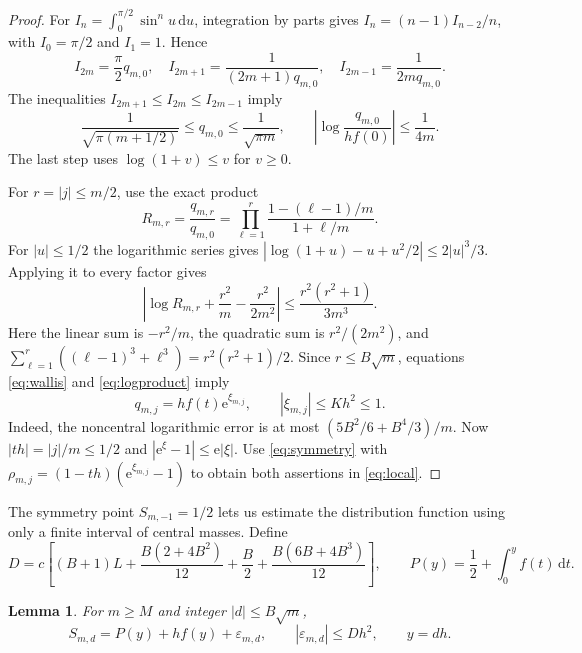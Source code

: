 \documentclass[11pt]{amsart}
\newtheorem{lemma}[theorem]{Lemma}
\newcommand{\ee}{\mathrm e}
\newcommand{\dd}{\,\mathrm d}
\begin{document}
\begin{proof}
For $I_n=\int_0^{\pi/2}\sin^n u\dd u$, integration by parts gives
$I_n=(n-1)I_{n-2}/n$, with $I_0=\pi/2$ and $I_1=1$. Hence
\[
 I_{2m}=\frac\pi2q_{m,0},\quad
 I_{2m+1}=\frac1{(2m+1)q_{m,0}},\quad
 I_{2m-1}=\frac1{2m q_{m,0}}.
\]
The inequalities $I_{2m+1}\le I_{2m}\le I_{2m-1}$ imply
\begin{equation}\label{eq:wallis}
 \frac1{\sqrt{\pi(m+1/2)}}\le q_{m,0}\le\frac1{\sqrt{\pi m}},
 \qquad
 \left|\log\frac{q_{m,0}}{hf(0)}\right|\le\frac1{4m}.
\end{equation}
The last step uses $\log(1+v)\le v$ for $v\ge0$.

For $r=|j|\le m/2$, use the exact product
\[
 R_{m,r}=\frac{q_{m,r}}{q_{m,0}}
 =\prod_{\ell=1}^{r}\frac{1-(\ell-1)/m}{1+\ell/m}.
\]
For $|u|\le1/2$ the logarithmic series gives
$|\log(1+u)-u+u^2/2|\le 2|u|^3/3$. Applying it to every factor gives
\begin{equation}\label{eq:logproduct}
 \left|\log R_{m,r}+\frac{r^2}{m}-\frac{r^2}{2m^2}\right|
 \le \frac{r^2(r^2+1)}{3m^3}.
\end{equation}
Here the linear sum is $-r^2/m$, the quadratic sum is $r^2/(2m^2)$,
and $\sum_{\ell=1}^r((\ell-1)^3+\ell^3)=r^2(r^2+1)/2$.
Since $r\le B\sqrt m$, equations \eqref{eq:wallis} and
\eqref{eq:logproduct} imply
\[
 q_{m,j}=hf(t)\ee^{\xi_{m,j}},\qquad
 |\xi_{m,j}|\le Kh^2\le1.
\]
Indeed, the noncentral logarithmic error is at most
$(5B^2/6+B^4/3)/m$.
Now $|th|=|j|/m\le1/2$ and $|\ee^\xi-1|\le\ee|\xi|$.
Use \eqref{eq:symmetry} with
$\rho_{m,j}=(1-th)(\ee^{\xi_{m,j}}-1)$ to obtain both assertions
in \eqref{eq:local}.
\end{proof}

The symmetry point $S_{m,-1}=1/2$ lets us estimate the distribution
function using only a finite interval of central masses.
Define
\begin{equation}\label{eq:D}
 D=c\left[(B+1)L+\frac{B(2+4B^2)}{12}
                   +\frac B2+\frac{B(6B+4B^3)}{12}\right],
 \qquad P(y)=\frac12+\int_0^y f(t)\dd t.
\end{equation}

\begin{lemma}\label{lem:cdf}
For $m\ge M$ and integer $|d|\le B\sqrt m$,
\begin{equation}\label{eq:cdf}
 S_{m,d}=P(y)+hf(y)+\varepsilon_{m,d},
 \qquad |\varepsilon_{m,d}|\le Dh^2,\qquad y=dh.
\end{equation}
\end{lemma}
\end{document}
